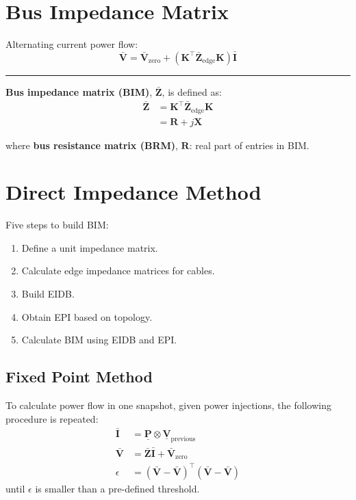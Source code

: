 \documentclass[
]{book}
\providecommand{\tightlist}{%
  \setlength{\itemsep}{0pt}\setlength{\parskip}{0pt}}
\begin{document}
\hypertarget{BIM}{%
\section{Bus Impedance Matrix}\label{BIM}}

Alternating current power flow:
\[
  \bar{\boldsymbol{V}} = \bar{\boldsymbol{V}}_{\text{zero}}
    + \left( \boldsymbol{K}^{\top} \boldsymbol{\bar{Z}}_\text{edge}
    \boldsymbol{K} \right) \bar{\boldsymbol{I}}
\]

\begin{center}\rule{0.5\linewidth}{0.5pt}\end{center}

\textbf{Bus impedance matrix (BIM)}, \(\boldsymbol{\bar{Z}}\), is defined as:
\[ \begin{aligned}
  \boldsymbol{\bar{Z}}
    &= \boldsymbol{K}^{\top} \boldsymbol{\bar{Z}}_\text{edge}
    \boldsymbol{K} \\
    &= \boldsymbol{R} + j \boldsymbol{X}
\end{aligned} \]

where \textbf{bus resistance matrix (BRM)}, \(\boldsymbol{R}\): real part of entries
in BIM.

\hypertarget{direct-impedance-method}{%
\section{Direct Impedance Method}\label{direct-impedance-method}}

Five steps to build BIM:

\begin{enumerate}
\def\labelenumi{\arabic{enumi}.}
\tightlist
\item
  Define a unit impedance matrix.
\item
  Calculate edge impedance matrices for cables.
\item
  Build EIDB.
\item
  Obtain EPI based on topology.
\item
  Calculate BIM using EIDB and EPI.
\end{enumerate}

\hypertarget{fixed-point-method}{%
\subsection*{Fixed Point Method}\label{fixed-point-method}}

To calculate power flow in one snapshot, given power injections, the following
procedure is repeated:
\[ \begin{aligned}
    \boldsymbol{\bar{I}} &= \boldsymbol{\underline{P}}
      \otimes \boldsymbol{\underline{V}}_\text{previous} \\
    \boldsymbol{\bar{V}}
    &= \boldsymbol{\bar{Z}} \boldsymbol{\bar{I}}
      + \boldsymbol{\bar{V}}_\text{zero} \\
    \epsilon
    &= \left( \boldsymbol{\bar{V}} - \boldsymbol{\bar{V}} \right)^\top
      \left( \boldsymbol{\bar{V}} - \boldsymbol{\bar{V}} \right)
\end{aligned} \]
until \(\epsilon\) is smaller than a pre-defined threshold.
\end{document}
